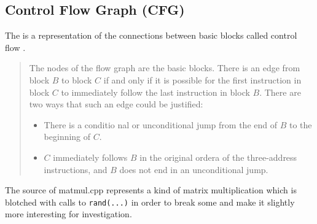 \subsection{Control Flow Graph (CFG)}\label{subsec:cfg}
The \cfg is a representation of the connections between basic blocks called control flow \cite[chapter 8.4.3, p.~529]{Drachenbuch}.

\begin{quotation}
    The nodes of the flow graph are the basic blocks.
    There is an edge from block \(B\) to block \(C\) if and only if it is possible for the first instruction in block \(C\) to immediately follow the last instruction in block \(B\).
    There are two ways that such an edge could be justified:
    \begin{itemize}
        \item There is a conditio nal or unconditional jump from the end of \(B\) to the beginning of \(C\).
        \item \(C\) immediately follows \(B\) in the original ordera of the three-address instructions, and \(B\) does not end in an unconditional jump.
    \end{itemize}
\end{quotation}
\begin{code}
    \caption[Source of matmul.cpp]{The source of matmul.cpp represents a kind of matrix multiplication which is blotched with calls to \texttt{rand(...)} in order to break some \scops and make it slightly more interesting for investigation.}
    \inputminted{c++}{cpp/matmul.cpp}
    \label{lst:matmulcpp}
\end{code}

